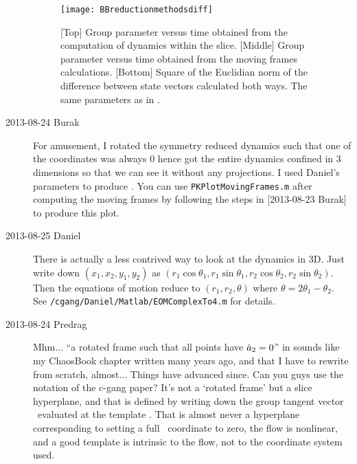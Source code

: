 \begin{description}
\begin{figure}%
  \begin{center}
  \texttt{[image: BBreductionmethodsdiff]}
  \end{center}
  \caption{
  [Top] Group parameter versus time obtained from the computation of
  dynamics within the slice. [Middle] Group parameter versus time
  obtained from the moving frames calculations. [Bottom] Square of
  the Euclidian norm of the difference between state vectors
  calculated both ways. The same parameters as in
  .
  }
  \label{fig:BBreductionmethodsdiff}
\end{figure}

\item[2013-08-24 Burak] For amusement, I rotated the symmetry reduced dynamics such that one of the coordinates was always 0 hence got the entire dynamics confined in 3 dimensions so that we can see it without any projections. I used Daniel's parameters to produce . You can use \texttt{PKPlotMovingFrames.m} after computing the moving frames by following the steps in [2013-08-23 Burak] to produce this plot.

\item[2013-08-25 Daniel] There is actually a less contrived way to look at the dynamics in 3D. Just write down $(x_1,x_2,y_1,y_2)$ as $(r_1\cos{\theta_1},r_1\sin{\theta_1},r_2\cos{\theta_2},r_2\sin{\theta_2})$. Then the equations of motion reduce to $(r_1,r_2,\theta)$ where $\theta=2\theta_1 - \theta_2$.
\\
See \texttt{/cgang/Daniel/Matlab/EOMComplexTo4.m} for details.



\item[2013-08-24 Predrag] Mhm... ``a rotated frame such that all
points have $\hat{a}_2 = 0$'' in 
sounds like my ChaosBook chapter
written many years ago, and that I have to rewrite from scratch,
almost... Things have advanced since. Can you guys use the notation
of the c-gang paper? It's not a `rotated frame' but a
slice hyperplane, and that is defined by writing down the group
tangent vector \sliceTan\ evaluated at the template \slicep. That is
almost never a hyperplane corresponding to setting a full \statesp\
coordinate to zero, the flow is nonlinear, and a good template is
intrinsic to the flow, not to the coordinate system used.


\end{description}
